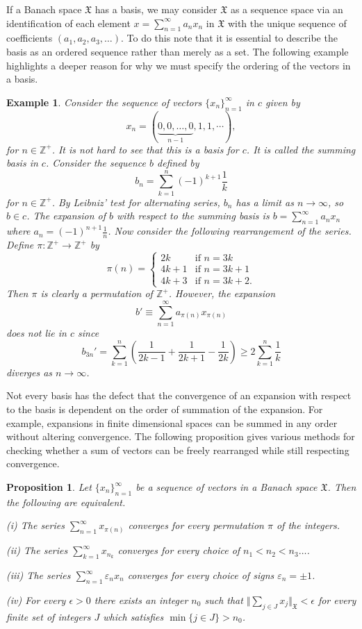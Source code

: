 \documentclass[mmath,12pt]{unswthesis}   %
\newcommand{\Z}{\mathbb{Z}}
\newcommand{\X}{\mathfrak{X}}
\def\ssnorm#1{\Vert #1 \Vert}
\newtheorem{proposition}[theorem]{Proposition}
\newtheorem{example}[theorem]{Example}
\numberwithin{equation}{section}
\begin{document}
If a Banach space $\X$ has a basis, we may consider $\X$ as a sequence
space via an identification of each element $x=\sum_{n=1}^{\infty}a_nx_n$ in
$\X$ with the unique sequence of coefficients $(a_1,a_2,a_3,\ldots)$. To do this
note that it is essential to describe the basis as an ordered sequence rather
than merely as a set. The following example highlights a deeper reason for
why we must specify the ordering of the vectors in a basis.

\begin{example}\label{summing basis}
Consider the sequence of vectors $\{x_n\}_{n=1}^{\infty}$ in $c$ given by
\[x_n=(\underbrace{0,0,\ldots,0}_{n-1},1,1,\cdots),\]
for $n\in\Z^+$. It is not hard to see that this is a basis for $c$.
It is called the {\em summing basis} in $c$.
Consider the sequence $b$ defined by
\[b_n=\sum_{k=1}^n(-1)^{k+1}\frac{1}{k}\]
for $n\in\Z^+$. By Leibniz' test for alternating series,
$b_n$ has a limit as $n\rightarrow\infty$, so $b\in c$. The expansion of $b$ 
with
respect to the summing basis is $b=\sum_{n=1}^{\infty}a_nx_n$ where
$a_n=(-1)^{n+1}\frac{1}{n}$. Now consider the following rearrangement of the
series. Define $\pi:\Z^+\rightarrow\Z^+$ by
\[\pi(n)=\left\{\begin{array}{ll}
				2k & \mbox{if $n=3k$}\\
				4k+1 & \mbox{if $n=3k+1$}\\
				4k+3 & \mbox{if $n=3k+2$.}
			\end{array}\right.
\]
Then $\pi$ is clearly a permutation of $\Z^+$. However, the expansion
\[b'\equiv\sum_{n=1}^{\infty}a_{\pi(n)}x_{\pi(n)}\]
does not lie in $c$ since
\[b_{3n}'=\sum_{k=1}^n\left(\frac{1}{2k-1}+\frac{1}{2k+1}-\frac{1}{2k}\right)
\geq 2\sum_{k=1}^n\frac{1}{k}\]
diverges as $n\rightarrow\infty$.
\end{example}

Not every basis has the defect that the convergence of an expansion with respect
to the basis is dependent on the order of summation of the expansion. For
example, expansions in finite dimensional spaces can be summed in any order
without altering convergence. The following proposition gives various methods 
for
checking whether a sum of vectors can be freely rearranged while still
respecting convergence.

\begin{proposition}\label{unconditional conv}
\cite[Proposition 1.c.1]{Lind}
Let $\{x_n\}_{n=1}^{\infty}$ be a sequence of vectors in a Banach space $\X$.
Then the following are equivalent.

(i) The series $\sum_{n=1}^{\infty}x_{\pi(n)}$ converges for every permutation
$\pi$ of the integers.

(ii) The series $\sum_{k=1}^{\infty}x_{n_k}$ converges for every choice of
$n_1<n_2<n_3\ldots$.

(iii) The series $\sum_{n=1}^{\infty}\varepsilon_nx_n$ converges
for every choice of signs $\varepsilon_n=\pm 1$.

(iv) For every $\epsilon>0$ there exists an integer $n_0$ such that
$\ssnorm{\sum_{j\in J}x_j}_{\X}<\epsilon$ for every finite set of integers $J$
which satisfies $\min\{j\in J\}>n_0$.
\end{proposition}
\end{document}
